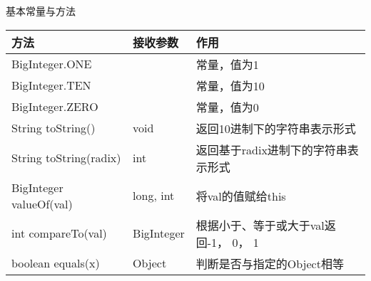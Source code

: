 基本常量与方法 
\begin{longtable}{|p{6.2cm}|p{2.7cm}|p{6.2cm}|}
\hline
方法 & 接收参数 & 作用 \\
\hline
 BigInteger.ONE & & 常量，值为1 \\
\hline
 BigInteger.TEN & & 常量，值为10 \\
\hline
 BigInteger.ZERO & & 常量，值为0 \\
\hline
 String toString() & void & 返回10进制下的字符串表示形式 \\
\hline
 String toString(radix) & int & 返回基于radix进制下的字符串表示形式 \\
\hline
 BigInteger valueOf(val) & long, int & 将val的值赋给this \\
\hline
 int compareTo(val) & BigInteger & 根据小于、等于或大于val返回-1， 0， 1 \\
\hline
 boolean equals(x) & Object & 判断是否与指定的Object相等 \\
\hline
\end{longtable}

